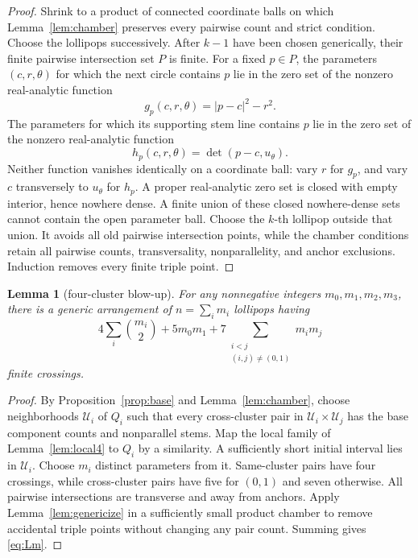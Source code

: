 \documentclass[11pt]{article}
\theoremstyle{plain}
\newtheorem{lemma}[theorem]{Lemma}
\theoremstyle{definition}
\theoremstyle{remark}
\newcommand{\1}{\mathbf 1}
\begin{document}
\begin{proof}
Shrink to a product of connected coordinate balls on which
Lemma~\ref{lem:chamber} preserves every pairwise count and strict condition.
Choose the lollipops successively.  After $k-1$ have been chosen generically,
their finite pairwise intersection set $P$ is finite.  For a fixed $p\in P$,
the parameters $(c,r,\theta)$ for which the next circle contains $p$ lie in
the zero set of the nonzero real-analytic function
\[
 g_p(c,r,\theta)=|p-c|^2-r^2.
\]
The parameters for which its supporting stem line contains $p$ lie in the
zero set of the nonzero real-analytic function
\[
 h_p(c,r,\theta)=\det(p-c,u_\theta).
\]
Neither function vanishes identically on a coordinate ball: vary $r$ for
$g_p$, and vary $c$ transversely to $u_\theta$ for $h_p$.  A proper
real-analytic zero set is closed with empty interior, hence nowhere dense.
A finite union of these closed nowhere-dense sets cannot contain the open
parameter ball.  Choose the $k$-th lollipop outside that union.  It avoids all
old pairwise intersection points, while the chamber conditions retain all
pairwise counts, transversality, nonparallelity, and anchor exclusions.
Induction removes every finite triple point.
\end{proof}

\begin{lemma}[four-cluster blow-up]\label{lem:blowup}
For any nonnegative integers $m_0,m_1,m_2,m_3$, there is a generic arrangement
of $n=\sum_i m_i$ lollipops having
\begin{equation}\label{eq:Lm}
 4\sum_i\binom{m_i}{2}+5m_0m_1
 +7\sum_{\substack{i<j\\(i,j)\ne(0,1)}}m_i m_j
\end{equation}
finite crossings.
\end{lemma}

\begin{proof}
By Proposition~\ref{prop:base} and Lemma~\ref{lem:chamber}, choose
neighborhoods $\mathcal U_i$ of $Q_i$ such that every cross-cluster pair in
$\mathcal U_i\times\mathcal U_j$ has the base component counts and nonparallel
stems.  Map the local family of Lemma~\ref{lem:local4} to $Q_i$ by a
similarity.  A sufficiently short initial interval lies in $\mathcal U_i$.
Choose $m_i$ distinct parameters from it.  Same-cluster pairs have four
crossings, while cross-cluster pairs have five for $(0,1)$ and seven otherwise.
All pairwise intersections are transverse and away from anchors.  Apply
Lemma~\ref{lem:genericize} in a sufficiently small product chamber to remove
accidental triple points without changing any pair count.  Summing gives
\eqref{eq:Lm}.
\end{proof}
\end{document}
